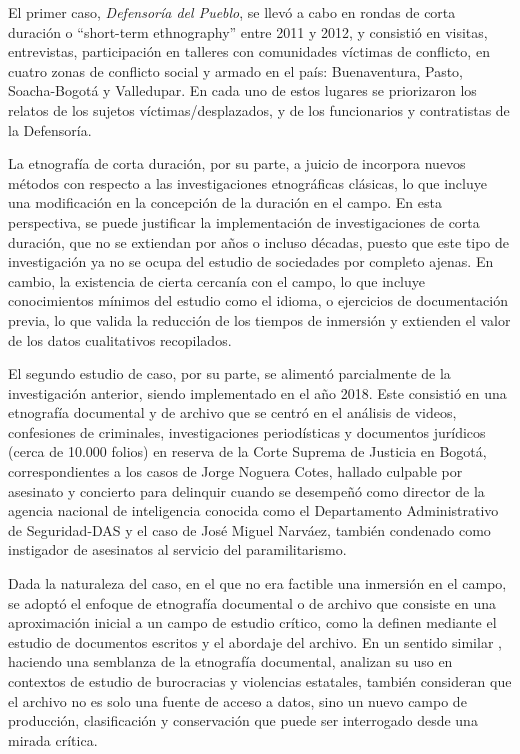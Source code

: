 \documentclass[
  spanish,
  11pt,
  a4paper,
]{scrbook}
\begin{document}
El primer caso, \emph{Defensoría del Pueblo}, se llevó a cabo en rondas
de corta duración o ``short-term ethnography'' entre 2011 y 2012, y
consistió en visitas, entrevistas, participación en talleres con
comunidades víctimas de conflicto, en cuatro zonas de conflicto social y
armado en el país: Buenaventura, Pasto, Soacha-Bogotá y Valledupar. En
cada uno de estos lugares se priorizaron los relatos de los sujetos
víctimas/desplazados, y de los funcionarios y contratistas de la
Defensoría.~

La etnografía de corta duración, por su parte, a juicio de
\textcite{Wall2015} incorpora nuevos métodos con respecto a las
investigaciones etnográficas clásicas, lo que incluye una modificación
en la concepción de la duración en el campo. En esta perspectiva, se
puede justificar la implementación de investigaciones de corta duración,
que no se extiendan por años o incluso décadas, puesto que este tipo de
investigación ya no se ocupa del estudio de sociedades por completo
ajenas. En cambio, la existencia de cierta cercanía con el campo, lo que
incluye conocimientos mínimos del estudio como el idioma, o ejercicios
de documentación previa, lo que valida la reducción de los tiempos de
inmersión y extienden el valor de los datos cualitativos recopilados.

El segundo estudio de caso, por su parte, se alimentó parcialmente de la
investigación anterior, siendo implementado en el año 2018. Este
consistió en una etnografía documental y de archivo que se centró en el
análisis de videos, confesiones de criminales, investigaciones
periodísticas y documentos jurídicos (cerca de 10.000 folios) en reserva
de la Corte Suprema de Justicia en Bogotá, correspondientes a los casos
de Jorge Noguera Cotes, hallado culpable por asesinato y concierto para
delinquir cuando se desempeñó como director de la agencia nacional de
inteligencia conocida como el Departamento Administrativo de
Seguridad-DAS y el caso de José Miguel Narváez, también condenado como
instigador de asesinatos al servicio del paramilitarismo.

Dada la naturaleza del caso, en el que no era factible una inmersión en
el campo, se adoptó el enfoque de etnografía documental o de archivo que
consiste en una aproximación inicial a un campo de estudio crítico, como
la definen \textcite{LoperaEspinosa2024} mediante el estudio de
documentos escritos y el abordaje del archivo. En un sentido similar
\textcite{Muzzopappa2022}, haciendo una semblanza de la etnografía
documental, analizan su uso en contextos de estudio de burocracias y
violencias estatales, también consideran que el archivo no es solo una
fuente de acceso a datos, sino un nuevo campo de producción,
clasificación y conservación que puede ser interrogado desde una mirada
crítica.~
\end{document}
